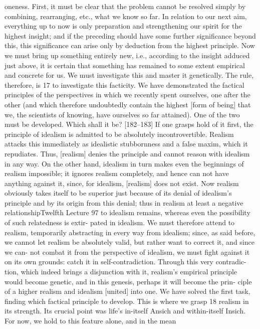 oneness.
First, it must be clear that the problem cannot be resolved simply by
combining, rearranging, etc., what we know so far. In relation to our next aim,
everything up to now is only preparation and strengthening our spirit for the
highest insight; and if the preceding should have some further significance
beyond this, this significance can arise only by deduction from the highest
principle. Now we must bring up something entirely new, i.e., according to the
insight adduced just above, it is certain that something has remained to some
extent empirical and concrete for us. We must investigate this and master it
genetically. The rule, therefore, is 17 to investigate this facticity. We have
demonstrated the factical principles of the perspectives in which we recently
spent ourselves, one after the other (and which therefore undoubtedly contain
the highest [form of being] that we, the scientists of knowing, have ourselves
so far attained). One of the two must be developed. Which shall it be?
[182–183] If one grasps hold of it first, the principle of idealism is
admitted to be absolutely incontrovertible. Realism attacks this immediately
as idealistic stubbornness and a false maxim, which it repudiates. Thus,
[realism] denies the principle and cannot reason with idealism in any way.
On the other hand, idealism in turn makes even the beginnings of realism
impossible; it ignores realism completely, and hence can not have anything
against it, since, for idealism, [realism] does not exist. Now realism obviously
takes itself to be superior just because of its denial of idealism’s principle and
by its origin from this denial; thus in realism at least a negative relationshipTwelfth Lecture
97
to idealism remains, whereas even the possibility of such relatedness is extir-
pated in idealism. We must therefore attend to realism, temporarily
abstracting in every way from idealism; since, as said before, we cannot let
realism be absolutely valid, but rather want to correct it, and since we can-
not combat it from the perspective of idealism, we must fight against it on
its own grounds: catch it in self-contradiction. Through this very contradic-
tion, which indeed brings a disjunction with it, realism’s empirical principle
would become genetic, and in this genesis, perhaps it will become the prin-
ciple of a higher realism and idealism [united] into one. We have solved the
first task, finding which factical principle to develop. This is where we
grasp 18 realism in its strength. Its crucial point was life’s in-itself {Ansich} and
within-itself {Insich}. For now, we hold to this feature alone, and in the mean
